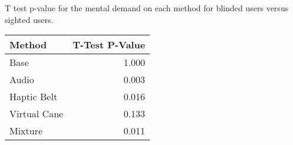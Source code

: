 
\centering
\caption{T test p-value for the mental demand on each method for blinded users versus sighted users.}
\label{tab:ttest_mental_demand}
\begin{tabular}{lr}
\toprule
      Method &  T-Test P-Value \\
\midrule
        Base &           1.000 \\
       Audio &           0.003 \\
 Haptic Belt &           0.016 \\
Virtual Cane &           0.133 \\
     Mixture &           0.011 \\
\bottomrule
\end{tabular}
